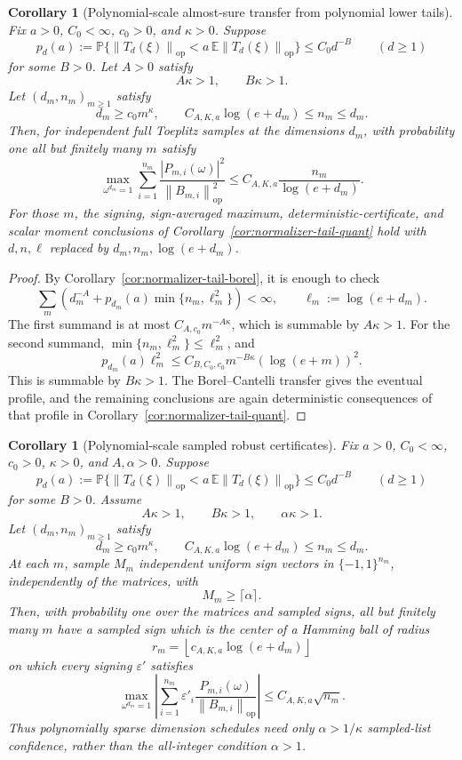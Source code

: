 \documentclass[11pt]{amsart}
\numberwithin{equation}{section}
\newtheorem{corollary}[theorem]{Corollary}
\theoremstyle{definition}
\theoremstyle{remark}
\newcommand{\op}{\mathrm{op}}
\newcommand{\Prob}{\mathbb P}
\newcommand{\Exp}{\mathbb E}
\newcommand{\norm}[1]{\left\lVert #1\right\rVert}
\newcommand{\abs}[1]{\left\lvert #1\right\rvert}
\newcommand{\eps}{\varepsilon}
\begin{document}
\begin{corollary}[Polynomial-scale almost-sure transfer from polynomial lower tails]
\label{cor:normalizer-tail-borel-polynomial-scale}
Fix \(a>0\), \(C_0<\infty\), \(c_0>0\), and \(\kappa>0\).  Suppose
\[
  p_d(a):=\Prob\{\norm{T_d(\xi)}_{\op}<a\,\Exp\norm{T_d(\xi)}_{\op}\}
  \le C_0d^{-B}
  \qquad(d\ge1)
\]
for some \(B>0\).  Let \(A>0\) satisfy
\[
  A\kappa>1,\qquad B\kappa>1.
\]
Let \((d_m,n_m)_{m\ge1}\) satisfy
\[
  d_m\ge c_0m^\kappa,\qquad
  C_{A,K,a}\log(e+d_m)\le n_m\le d_m .
\]
Then, for independent full Toeplitz samples at the dimensions \(d_m\), with
probability one all but finitely many \(m\) satisfy
\[
  \max_{\omega^{d_m}=1}
  \sum_{i=1}^{n_m}
  \frac{\abs{P_{m,i}(\omega)}^2}{\norm{B_{m,i}}_{\op}^2}
  \le C_{A,K,a}\frac{n_m}{\log(e+d_m)}.
\]
For those \(m\), the signing, sign-averaged maximum, deterministic-certificate,
and scalar moment conclusions of Corollary~\ref{cor:normalizer-tail-quant} hold
with \(d,n,\ell\) replaced by \(d_m,n_m,\log(e+d_m)\).
\end{corollary}

\begin{proof}
By Corollary~\ref{cor:normalizer-tail-borel}, it is enough to check
\[
  \sum_m\left(d_m^{-A}+p_{d_m}(a)\min\{n_m,\ell_m^2\}\right)<\infty,
  \qquad \ell_m:=\log(e+d_m).
\]
The first summand is at most \(C_{A,c_0}m^{-A\kappa}\), which is summable by
\(A\kappa>1\).  For the second summand, \(\min\{n_m,\ell_m^2\}\le\ell_m^2\),
and
\[
  p_{d_m}(a)\ell_m^2
  \le C_{B,C_0,c_0}m^{-B\kappa}(\log(e+m))^2.
\]
This is summable by \(B\kappa>1\).  The Borel--Cantelli transfer gives the
eventual profile, and the remaining conclusions are again deterministic
consequences of that profile in Corollary~\ref{cor:normalizer-tail-quant}.
\end{proof}

\begin{corollary}[Polynomial-scale sampled robust certificates]
\label{cor:normalizer-tail-borel-polynomial-sampled}
Fix \(a>0\), \(C_0<\infty\), \(c_0>0\), \(\kappa>0\), and \(A,\alpha>0\).
Suppose
\[
  p_d(a):=\Prob\{\norm{T_d(\xi)}_{\op}<a\,\Exp\norm{T_d(\xi)}_{\op}\}
  \le C_0d^{-B}
  \qquad(d\ge1)
\]
for some \(B>0\).  Assume
\[
  A\kappa>1,\qquad B\kappa>1,\qquad \alpha\kappa>1.
\]
Let \((d_m,n_m)_{m\ge1}\) satisfy
\[
  d_m\ge c_0m^\kappa,\qquad
  C_{A,K,a}\log(e+d_m)\le n_m\le d_m .
\]
At each \(m\), sample \(M_m\) independent uniform sign vectors in
\(\{-1,1\}^{n_m}\), independently of the matrices, with
\[
  M_m\ge\lceil\alpha\rceil .
\]
Then, with probability one over the matrices and sampled signs, all but
finitely many \(m\) have a sampled sign which is the center of a Hamming ball of
radius
\[
  r_m=\left\lfloor c_{A,K,a}\log(e+d_m)\right\rfloor
\]
on which every signing \(\eps'\) satisfies
\[
  \max_{\omega^{d_m}=1}\left|\sum_{i=1}^{n_m}
  \eps'_i\frac{P_{m,i}(\omega)}{\norm{B_{m,i}}_{\op}}\right|
  \le C_{A,K,a}\sqrt{n_m}.
\]
Thus polynomially sparse dimension schedules need only
\(\alpha>1/\kappa\) sampled-list confidence, rather than the all-integer
condition \(\alpha>1\).
\end{corollary}
\end{document}
